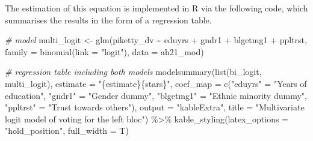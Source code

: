 \documentclass[
]{article}
\newenvironment{Shaded}{\begin{snugshade}}{\end{snugshade}}
\newcommand{\AttributeTok}[1]{\textcolor[rgb]{0.77,0.63,0.00}{#1}}
\newcommand{\CommentTok}[1]{\textcolor[rgb]{0.56,0.35,0.01}{\textit{#1}}}
\newcommand{\FunctionTok}[1]{\textcolor[rgb]{0.00,0.00,0.00}{#1}}
\newcommand{\NormalTok}[1]{#1}
\newcommand{\OtherTok}[1]{\textcolor[rgb]{0.56,0.35,0.01}{#1}}
\newcommand{\SpecialCharTok}[1]{\textcolor[rgb]{0.00,0.00,0.00}{#1}}
\newcommand{\StringTok}[1]{\textcolor[rgb]{0.31,0.60,0.02}{#1}}
\begin{document}
The estimation of this equation is implemented in R via the following
code, which summarises the results in the form of a regression table.

\begin{Shaded}
\begin{Highlighting}[]
\CommentTok{\# model}
\NormalTok{multi\_logit }\OtherTok{\textless{}{-}} \FunctionTok{glm}\NormalTok{(piketty\_dv }\SpecialCharTok{\textasciitilde{}}\NormalTok{ eduyrs }\SpecialCharTok{+}\NormalTok{ gndr1 }\SpecialCharTok{+}\NormalTok{ blgetmg1 }\SpecialCharTok{+}\NormalTok{ ppltrst, }
                   \AttributeTok{family =} \FunctionTok{binomial}\NormalTok{(}\AttributeTok{link =} \StringTok{"logit"}\NormalTok{),}
                   \AttributeTok{data =}\NormalTok{ ah21\_mod)}

\CommentTok{\# regression table including both models}
\FunctionTok{modelsummary}\NormalTok{(}\FunctionTok{list}\NormalTok{(bi\_logit, multi\_logit),}
             \AttributeTok{estimate =} \StringTok{"\{estimate\}\{stars\}"}\NormalTok{, }
             \AttributeTok{coef\_map =} \FunctionTok{c}\NormalTok{(}\StringTok{"eduyrs"} \OtherTok{=} \StringTok{"Years of education"}\NormalTok{,}
                         \StringTok{"gndr1"} \OtherTok{=} \StringTok{"Gender dummy"}\NormalTok{,}
                         \StringTok{"blgetmg1"} \OtherTok{=} \StringTok{"Ethnic minority dummy"}\NormalTok{,}
                         \StringTok{"ppltrst"} \OtherTok{=} \StringTok{"Trust towards others"}\NormalTok{),}
             \AttributeTok{output =} \StringTok{"kableExtra"}\NormalTok{, }
             \AttributeTok{title =} \StringTok{"Multivariate logit model of voting for the left bloc"}\NormalTok{) }\SpecialCharTok{\%\textgreater{}\%}
  \FunctionTok{kable\_styling}\NormalTok{(}\AttributeTok{latex\_options =} \StringTok{"hold\_position"}\NormalTok{, }\AttributeTok{full\_width =}\NormalTok{ T) }
\end{Highlighting}
\end{Shaded}
\end{document}
